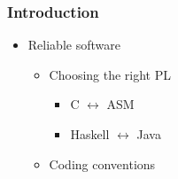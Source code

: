 
\begin{frame}

\frametitle{Introduction}

\begin{itemize}

\item<1-> Reliable software

\begin{itemize}

\item<2-> Choosing the right PL

\begin{itemize}

\item C $\longleftrightarrow$ ASM

\item Haskell $\longleftrightarrow$ Java

\end{itemize}

\item<3-> Coding conventions

\begin{itemize}


\end{itemize}
\end{itemize}
\end{itemize}
\end{frame}
